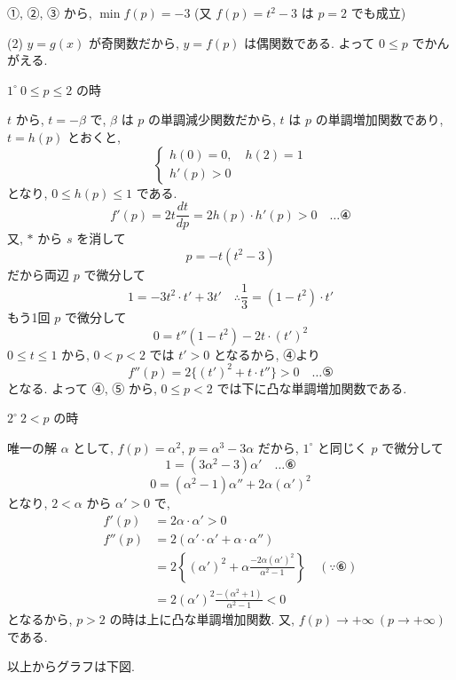 \documentclass[../main.tex]{subfiles}
\begin{document}
\noindent
①, ②, ③ から, $\min f(p) = -3$ \quad (又 $f(p) = t^2 - 3$ は $p=2$ でも成立)

\bigskip

\noindent
(2) $y = g(x)$ が奇関数だから, $y = f(p)$ は偶関数である. よって $0 \le p$ でかんがえる.

\medskip
\noindent
$1^\circ \ 0 \le p \le 2$ の時

\noindent
$t$ から, $t = -\beta$ で, $\beta$ は $p$ の単調減少関数だから, $t$ は $p$ の単調増加関数であり, $t = h(p)$ とおくと,
\[
  \begin{cases}
    h(0) = 0, \quad h(2) = 1 \\
    h'(p) > 0
  \end{cases}
\]
となり, $0 \le h(p) \le 1$ である.
\[
  f'(p) = 2t \frac{dt}{dp} = 2 h(p) \cdot h'(p) > 0 \quad \dots \text{④}
\]
又, $*$ から $s$ を消して
\[
  p = -t(t^2 - 3)
\]
だから両辺 $p$ で微分して
\[
  1 = -3t^2 \cdot t' + 3t' \quad \therefore \frac{1}{3} = (1 - t^2) \cdot t'
\]
もう1回 $p$ で微分して
\[
  0 = t''(1 - t^2) - 2t \cdot (t')^2
\]
$0 \le t \le 1$ から, $0 < p < 2$ では $t' > 0$ となるから, ④より
\[
  f''(p) = 2 \{ (t')^2 + t \cdot t'' \} > 0 \quad \dots \text{⑤}
\]
となる. よって ④, ⑤ から, $0 \le p < 2$ では下に凸な単調増加関数である.

\medskip
\noindent
$2^\circ \ 2 < p$ の時

\noindent
唯一の解 $\alpha$ として, $f(p) = \alpha^2$, $p = \alpha^3 - 3\alpha$ だから, $1^\circ$ と同じく $p$ で微分して
\[
  1 = (3\alpha^2 - 3)\alpha' \quad \dots \text{⑥}
\]
\[
  0 = (\alpha^2 - 1)\alpha'' + 2\alpha(\alpha')^2
\]
となり, $2 < \alpha$ から $\alpha' > 0$ で,
\begin{align*}
  f'(p) &= 2\alpha \cdot \alpha' > 0 \\
  f''(p) &= 2(\alpha' \cdot \alpha' + \alpha \cdot \alpha'') \\
  &= 2 \left\{ (\alpha')^2 + \alpha \frac{-2\alpha(\alpha')^2}{\alpha^2 - 1} \right\} \quad (\because \text{⑥}) \\
  &= 2(\alpha')^2 \frac{-(\alpha^2 + 1)}{\alpha^2 - 1} < 0
\end{align*}
となるから, $p > 2$ の時は上に凸な単調増加関数. 又, $f(p) \to +\infty \ (p \to +\infty)$ である.

\noindent
以上からグラフは下図.
\end{document}
